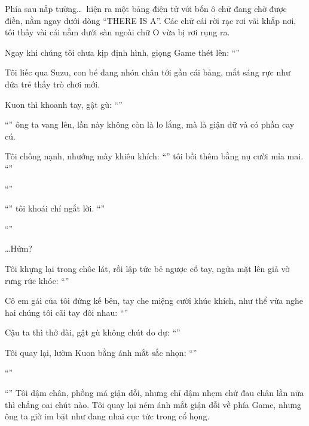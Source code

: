 \documentclass[../main.tex]{subfiles}
\begin{document}
Phía sau nắp tường\dots\ hiện ra một bảng điện tử với bốn ô chữ đang chờ được điền, nằm ngay dưới dòng ``THERE IS A''. Các chữ cái rời rạc rơi vãi khắp nơi, tôi thấy vài cái nằm dưới sàn ngoài chữ O vừa bị rơi rụng ra.


Ngay khi chúng tôi chưa kịp định hình, giọng Game thét lên: ``\textbf{}''

Tôi liếc qua Suzu, con bé đang nhón chân tới gần cái bảng, mắt sáng rực như đứa trẻ thấy trò chơi mới.

Kuon thì khoanh tay, gật gù: ``''

``'' ông ta vang lên, lần này không còn là lo lắng, mà là giận dữ và có phần cay cú.

Tôi chống nạnh, nhướng mày khiêu khích: ``'' tôi bồi thêm bằng nụ cười mỉa mai. ``''

``''

``'' tôi khoái chí ngắt lời. ``''

``''

\dots Hửm?

Tôi khựng lại trong chôc lát, rồi lập tức bẻ ngược cổ tay, ngửa mặt lên giả vờ rưng rức khóc: ``''

Cô em gái của tôi đứng kế bên, tay che miệng cười khúc khích, như thể vừa nghe hai chúng tôi cãi tay đôi nhau: ``''

Cậu ta thì thở dài, gật gù không chút do dự: ``''

Tôi quay lại, lườm Kuon bằng ánh mắt sắc nhọn: ``''

``''

``'' Tôi dậm chân, phồng má giận dỗi, nhưng chỉ dậm nhẹm chứ đau chân lần nữa thì chẳng oai chút nào. Tôi quay lại ném ánh mắt giận dỗi về phía Game, nhưng ông ta giờ im bặt như đang nhai cục tức trong cổ họng.
\end{document}
